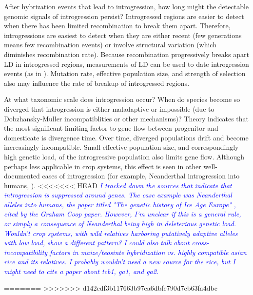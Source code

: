 \documentclass[11pt]{article}
\newcommand{\gmj}[1]{\textcolor{blue}{ \emph{\scriptsize  #1}} } %
\begin{document}
After hybrization events that lead to introgression, how long might the detectable genomic signals of introgression persist?
Introgressed regions are easier to detect when there has been limited recombination to break them apart.
Therefore, introgressions are easiest to detect when they are either recent (few generations means few recombination events) or involve structural variation (which diminishes recombination rate).
Because recombination progressively breaks apart LD in introgressed regions, measurements of LD can be used to date introgression events (as in \cite{Poets2015}).
Mutation rate, effective population size, and strength of selection also may influence the rate of breakup of introgressed regions.

At what taxonomic scale does introgression occur?
When do species become so diverged that introgression is either maladaptive or impossible (due to  Dobzhansky-Muller incompatiblities or other mechanisms)?
Theory indicates that the most significant limiting factor to gene flow between progenitor and domesticate is divergence time.
Over time, diverged populations drift and become increasingly incompatible.
Small effective population size, and correspondingly high genetic load, of the introgressive population also limits gene flow.
Although perhaps less applicable in crop systems, this effect is seen in other well-documented cases of introgression (for example, Neanderthal introgression into humans, \cite{harris2016genetic}).
<<<<<<< HEAD
\gmj{I tracked down the sources that indicate that introgression is suppressed around genes.  The case example was Neanderthal alleles into humans, the paper titled "The genetic history of Ice Age Europe" \cite{fu2016genetic}, cited by the Graham Coop paper.  However, I'm unclear if this is a general rule, or simply a consequence of Neanderthal being high in deleterious genetic load.  Wouldn't crop systems, with wild relatives harboring putatively adaptive alleles with low load, show a different pattern?}
\gmj{I could also talk about cross-incompatibility factors in maize/teosinte hybridization vs. highly compatible asian rice and its relatives.  I probably wouldn't need a new source for the rice, but I might need to cite a paper about tcb1, ga1, and ga2.}

=======
>>>>>>> d142edf3b117663b97ea6dbfe790d7cb63fa4dbc
\end{document}
